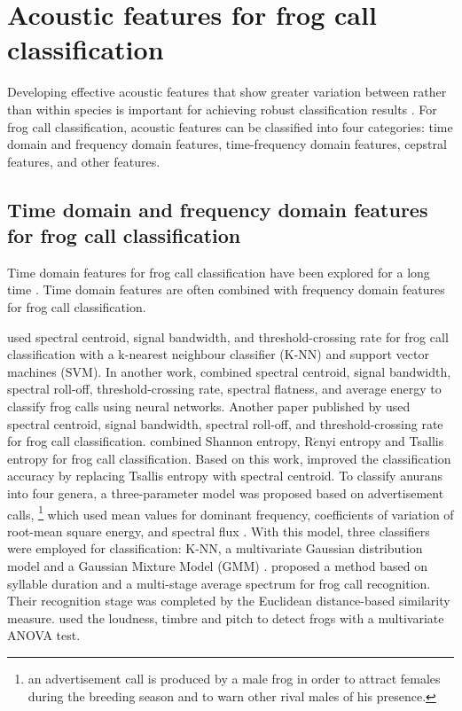 \section{Acoustic features for frog call classification}
\label{features}
Developing effective acoustic features that show greater variation between rather than within species is important for achieving robust classification results \citep{Fox20081187}. For frog call classification, acoustic features can be classified into four categories: time domain and frequency domain features, time-frequency domain features, cepstral features, and other features. 

\subsection{Time domain and frequency domain features for frog call classification}

Time domain features for frog call classification have been explored for a long time \citep{huang2008realization, huang2009frog, dayou2011classification, chen2012automatic, camacho2013automatic, Huang20141}. Time domain features are often combined with frequency domain features for frog call classification.
 
\cite{huang2009frog} used spectral centroid, signal bandwidth, and threshold-crossing rate for frog call classification with a k-nearest neighbour classifier (K-NN) and support vector machines (SVM). In another work, \cite{Huang20141} combined spectral centroid, signal bandwidth, spectral roll-off, threshold-crossing rate, spectral flatness, and average energy to classify frog calls using neural networks. Another paper published by  \citep{huang2008realization} used spectral centroid, signal bandwidth, spectral roll-off, and threshold-crossing rate for frog call classification. 
\cite{dayou2011classification} combined Shannon entropy, R$\acute{e}$nyi entropy and Tsallis entropy for frog call classification. Based on this work,  \cite{han2011acoustic} improved the classification accuracy by replacing Tsallis entropy with spectral centroid.
To classify anurans into four genera, a three-parameter model was proposed based on advertisement calls, \footnote[1]{an advertisement call is produced by a male frog in order to attract females during the breeding season and to warn other rival males of his presence.} which used mean values for dominant frequency, coefficients of variation of root-mean square energy, and spectral flux \citep{Gingras2013}. With this model, three classifiers  were employed for classification: K-NN, a multivariate Gaussian distribution model and a Gaussian Mixture Model (GMM) \citep{Gingras2013}.
\cite{chen2012automatic} proposed a method based on syllable duration and a multi-stage average spectrum for frog call recognition. Their recognition stage was completed by the Euclidean distance-based similarity measure. \cite{camacho2013automatic} used the loudness, timbre and pitch to detect frogs with a multivariate ANOVA test.






